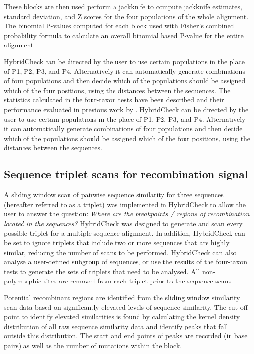 These blocks are then used perform a jackknife to compute jackknife estimates, standard deviation, and Z scores for the four populations of the whole alignment. The binomial P-values computed for each block used with Fisher’s combined probability formula to calculate an overall binomial based P-value for the entire alignment.

HybridCheck can be directed by the user to use certain populations in the place of P1, P2, P3, and P4. Alternatively it can automatically generate combinations of four populations and then decide which of the populations should be assigned which of the four positions, using the distances between the sequences. The statistics calculated in the four-taxon tests have been described and their performance evaluated in previous work by \cite{SMartin2014}. HybridCheck can be directed by the user to use certain populations in the place of P1, P2, P3, and P4. Alternatively it can automatically generate combinations of four populations and then decide which of the populations should be assigned which of the four positions, using the distances between the sequences.

\subsection{Sequence triplet scans for recombination signal}
A sliding window scan of pairwise sequence similarity for three sequences (hereafter referred to as a triplet) was implemented in HybridCheck to allow the user to answer the question: \textit{Where are the breakpoints / regions of recombination located in the sequences?} HybridCheck was designed to generate and scan every possible triplet for a multiple sequence alignment. In addition, HybridCheck can be set to ignore triplets that include two or more sequences that are highly similar, reducing the number of scans to be performed. HybridCheck can also analyse a user-defined subgroup of sequences, or use the results of the four-taxon tests to generate the sets of triplets that need to be analysed. All non-polymorphic sites are removed from each triplet prior to the sequence scans.

Potential recombinant regions are identified from the sliding window similarity scan data based on significantly elevated levels of sequence similarity. The cut-off point to identify elevated similarities is found by calculating the kernel density distribution of all raw sequence similarity data and identify peaks that fall outside this distribution. The start and end points of peaks are recorded (in base pairs) as well as the number of mutations within the block.

